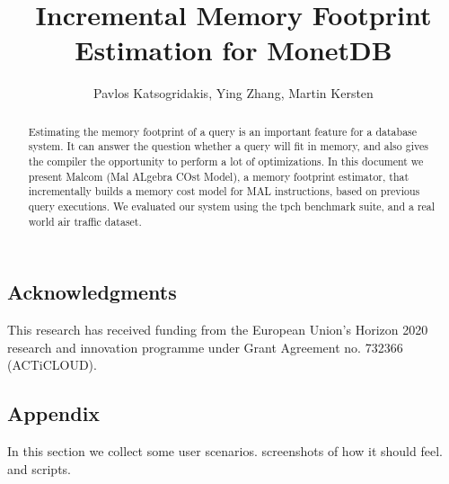 \documentclass{vldb}
\begin{document}
\title{Incremental Memory Footprint Estimation for MonetDB}

\author{Pavlos Katsogridakis, Ying Zhang, Martin Kersten}

\maketitle

\begin{abstract}
Estimating the memory footprint of a query is an important
feature for a database system. It can answer the question whether
a query will fit in memory, and also gives the compiler the opportunity
to perform a lot of optimizations.
In this document we present Malcom (Mal ALgebra COst Model), a memory footprint
estimator, that incrementally builds a memory cost model for MAL instructions,
based on previous query executions. We evaluated our system using the tpch
benchmark suite, and a real world air traffic dataset.
\end{abstract}







\subsection*{Acknowledgments}
This research has received funding from the European Union’s Horizon 2020 research and innovation programme under Grant Agreement no. 732366 (ACTiCLOUD).

{\small


}
\subsection*{Appendix}
In this section we collect some user scenarios. screenshots of how it should feel.
and scripts.
\end{document}

